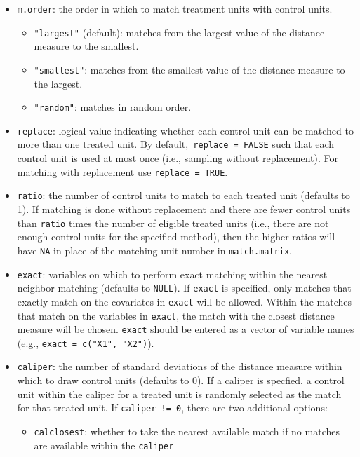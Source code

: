\begin{itemize}
\item \texttt{m.order}: the order in which to match treatment units
  with control units.
  \begin{itemize}
  \item {\tt "largest"} (default): matches from the largest value of
    the distance measure to the smallest.
  \item {\tt "smallest"}: matches from the smallest value of the
    distance measure to the largest.
  \item {\tt "random"}: matches in random order.
  \end{itemize}
\item \texttt{replace}: logical value indicating whether each control
  unit can be matched to more than one treated unit. By default,{\tt
    replace = FALSE} such that each control unit is used at most once
  (i.e., sampling without replacement). For matching with replacement
  use \texttt{replace = TRUE}.
\item \texttt{ratio}: the number of control units to match to each
  treated unit (defaults to 1).  If matching is done without
  replacement and there are fewer control units than {\tt ratio} times
  the number of eligible treated units (i.e., there are not enough
  control units for the specified method), then the higher ratios will
  have \texttt{NA} in place of the matching unit number in
  \texttt{match.matrix}.
\item \texttt{exact}: variables on which to perform exact matching
  within the nearest neighbor matching (defaults to {\tt NULL}).  If
  \texttt{exact} is specified, only matches that exactly match on the
  covariates in \texttt{exact} will be allowed.  Within the matches
  that match on the variables in \texttt{exact}, the match with the
  closest distance measure will be chosen.  \texttt{exact} should be
  entered as a vector of variable names (e.g., \texttt{exact = c("X1",
    "X2")}).
\item \texttt{caliper}: the number of standard deviations of the
  distance measure within which to draw control units (defaults to 0).
  If a caliper is specfied, a control unit within the caliper for a
  treated unit is randomly selected as the match for that treated
  unit.  If \texttt{caliper != 0}, there are two additional options:
  \begin{itemize} 
  \item \texttt{calclosest}: whether to take the nearest available
    match if no matches are available within the \texttt{caliper}

\end{itemize}
\end{itemize}
